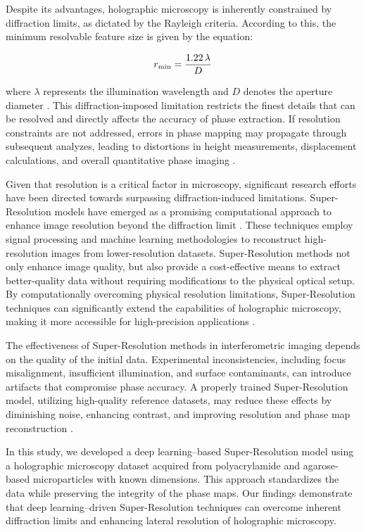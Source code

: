 \documentclass[10pt,twocolumn]{article}
\begin{document}
Despite its advantages, holographic microscopy is inherently constrained by diffraction limits, as dictated by the Rayleigh criteria. According to this, the minimum resolvable feature size is given by the equation:

\begin{equation}
r_{\text{min}} = \frac{1.22\,\lambda}{D}\\[5pt]
\end{equation}

where \(\lambda\) represents the illumination wavelength and \(D\) denotes the aperture diameter \cite{Goodman1996}. This diffraction-imposed limitation restricts the finest details that can be resolved and directly affects the accuracy of phase extraction. If resolution constraints are not addressed, errors in phase mapping may propagate through subsequent analyzes, leading to distortions in height measurements, displacement calculations, and overall quantitative phase imaging \cite{Li2023}.

Given that resolution is a critical factor in microscopy, significant research efforts have been directed towards surpassing diffraction-induced limitations. Super-Resolution models have emerged as a promising computational approach to enhance image resolution beyond the diffraction limit \cite{Wang2019}. These techniques employ signal processing and machine learning methodologies to reconstruct high-resolution images from lower-resolution datasets. Super-Resolution methods not only enhance image quality, but also provide a cost-effective means to extract better-quality data without requiring modifications to the physical optical setup. By computationally overcoming physical resolution limitations, Super-Resolution techniques can significantly extend the capabilities of holographic microscopy, making it more accessible for high-precision applications \cite{Rivenson2017}.

The effectiveness of Super-Resolution methods in interferometric imaging depends on the quality of the initial data. Experimental inconsistencies, including focus misalignment, insufficient illumination, and surface contaminants, can introduce artifacts that compromise phase accuracy. A properly trained Super-Resolution model, utilizing high-quality reference datasets, may reduce these effects by diminishing noise, enhancing contrast, and improving resolution and phase map reconstruction \cite{Liu2019}. 

In this study, we developed a deep learning–based Super-Resolution model using a holographic microscopy dataset acquired from polyacrylamide and agarose-based microparticles with known dimensions. This approach standardizes the data while preserving the integrity of the phase maps. Our findings demonstrate that deep learning–driven Super-Resolution techniques can overcome inherent diffraction limits and enhancing lateral resolution of holographic microscopy.
\end{document}
